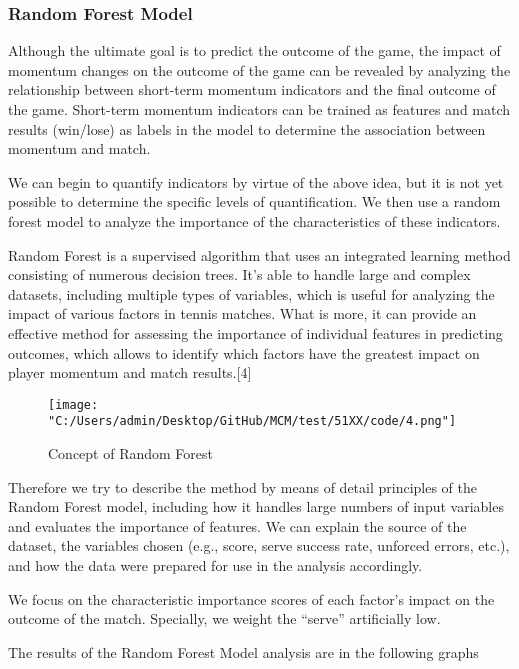 \documentclass{mcmthesis}
\begin{document}
\subsubsection{Random Forest Model}

    Although the ultimate goal is to predict the outcome of the game, the impact of momentum
changes on the outcome of the game can be revealed by analyzing the relationship between short-term momentum indicators and the final outcome of the game. Short-term momentum indicators
can be trained as features and match results (win/lose) as labels in the model to determine the
association between momentum and match. 

    We can begin to quantify indicators by virtue of the above idea, but it is not yet possible to
determine the specific levels of quantification. We then use a random forest model to analyze the
importance of the characteristics of these indicators. 

    Random Forest is a supervised algorithm that uses an integrated learning method consisting
of numerous decision trees. It’s able to handle large and complex datasets, including multiple
types of variables, which is useful for analyzing the impact of various factors in tennis matches. What is more, it can provide an effective method for assessing the importance of individual
features in predicting outcomes, which allows to identify which factors have the greatest impact
on player momentum and match results.[4]

\begin{figure}[h]   
\centering          
\texttt{[image: "C:/Users/admin/Desktop/GitHub/MCM/test/51XX/code/4.png"]}
\caption{Concept of Random Forest} \label{fig4}    
\end{figure} 

    Therefore we try to describe the method by means of detail principles of the Random Forest
model, including how it handles large numbers of input variables and evaluates the importance of
features. We can explain the source of the dataset, the variables chosen (e.g., score, serve success
rate, unforced errors, etc.), and how the data were prepared for use in the analysis accordingly. 

    We focus on the characteristic importance scores of each factor's impact on the outcome of
the match. Specially, we weight the “serve” artificially low. 

    The results of the Random Forest Model analysis are in the following graphs
\end{document}
